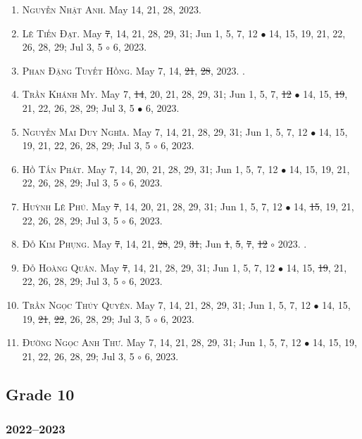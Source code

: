 \documentclass{article}
\begin{document}
\begin{enumerate}
	\item \textsc{Nguyễn Nhật Anh.} {\sf[In]} May 14, 21, 28, 2023. {\sf[Out]}
	\item \textsc{Lê Tiến Đạt.} May \st{7}, 14, 21, 28, 29, 31; Jun 1, 5, 7, 12 $\bullet$ 14, 15, 19, 21, 22, 26, 28, 29; Jul 3, 5 $\circ$ 6, 2023.
	\item \textsc{Phan Đặng Tuyết Hồng.} May 7, 14, \st{21}, \st{28}, 2023. {}. {\sf[Out]}
	\item \textsc{Trần Khánh My.} May 7, \st{14}, 20, 21,  28, 29, 31; Jun 1, 5, 7, \st{12} $\bullet$ 14, 15, \st{19}, 21, 22, 26, 28, 29; Jul 3, 5 $\bullet$ 6, 2023.
	\item \textsc{Nguyễn Mai Duy Nghĩa.} May 7, 14, 21,  28, 29, 31; Jun 1, 5, 7, 12 $\bullet$ 14, 15, 19, 21, 22, 26, 28, 29; Jul 3, 5 $\circ$ 6, 2023.
	\item \textsc{Hồ Tấn Phát.} May 7, 14, 20, 21, 28, 29, 31; Jun 1, 5, 7, 12 $\bullet$ 14, 15, 19, 21, 22, 26, 28, 29; Jul 3, 5 $\circ$ 6, 2023.
	\item \textsc{Huỳnh Lê Phú.} May \st{7}, 14, 20, 21, 28, 29, 31; Jun 1, 5, 7, 12 $\bullet$ 14, \st{15}, 19, 21, 22, 26, 28, 29; Jul 3, 5 $\circ$ 6, 2023.
	\item \textsc{Đỗ Kim Phụng.} May \st{7}, 14, 21, \st{28}, 29, \st{31}; Jun \st{1}, \st{5}, \st{7}, \st{12} $\circ$ 2023. {}. {\sf[Out]}
	\item \textsc{Đỗ Hoàng Quân.} May \st{7}, 14, 21, 28, 29, 31; Jun 1, 5, 7, 12 $\bullet$ 14, 15, \st{19}, 21, 22, 26, 28, 29; Jul 3, 5 $\circ$ 6, 2023.
	\item \textsc{Trần Ngọc Thúy Quyên.} May 7, 14, 21, 28, 29, 31; Jun 1, 5, 7, 12 $\bullet$ 14, 15, 19, \st{21}, \st{22}, 26, 28, 29; Jul 3, 5 $\circ$ 6, 2023.
	\item \textsc{Đường Ngọc Anh Thư.} May 7, 14, 21, 28, 29, 31; Jun 1, 5, 7, 12 $\bullet$ 14, 15, 19, 21, 22, 26, 28, 29; Jul 3, 5 $\circ$ 6, 2023.
\end{enumerate}


\subsection{Grade 10}

\subsubsection{2022--2023}
\end{document}
